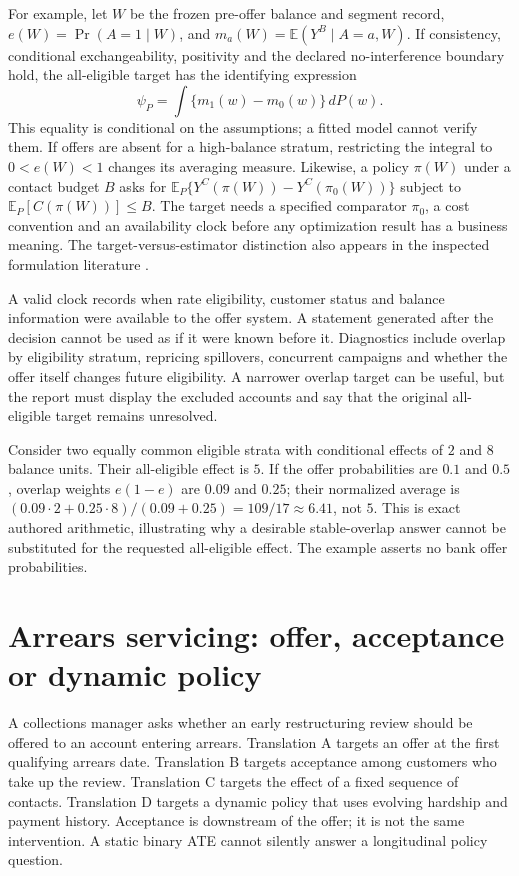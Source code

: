 For example, let $W$ be the frozen pre-offer balance and segment record, $e(W)=\Pr(A=1\mid W)$, and $m_a(W)=\mathbb E(Y^B\mid A=a,W)$. If consistency, conditional exchangeability, positivity and the declared no-interference boundary hold, the all-eligible target has the identifying expression
\[
 \psi_P=\int\{m_1(w)-m_0(w)\}\,dP(w).
\]
This equality is conditional on the assumptions; a fitted model cannot verify them. If offers are absent for a high-balance stratum, restricting the integral to $0<e(W)<1$ changes its averaging measure. Likewise, a policy $\pi(W)$ under a contact budget $B$ asks for $\mathbb E_P\{Y^C(\pi(W))-Y^C(\pi_0(W))\}$ subject to $\mathbb E_P[C(\pi(W))]\leq B$. The target needs a specified comparator $\pi_0$, a cost convention and an availability clock before any optimization result has a business meaning. The target-versus-estimator distinction also appears in the inspected formulation literature \citep{exec13_formulation_targets}.

A valid clock records when rate eligibility, customer status and balance information were available to the offer system. A statement generated after the decision cannot be used as if it were known before it. Diagnostics include overlap by eligibility stratum, repricing spillovers, concurrent campaigns and whether the offer itself changes future eligibility. A narrower overlap target can be useful, but the report must display the excluded accounts and say that the original all-eligible target remains unresolved.

Consider two equally common eligible strata with conditional effects of $2$ and $8$ balance units. Their all-eligible effect is $5$. If the offer probabilities are $0.1$ and $0.5$, overlap weights $e(1-e)$ are $0.09$ and $0.25$; their normalized average is $(0.09\cdot2+0.25\cdot8)/(0.09+0.25)=109/17\approx6.41$, not $5$. This is exact authored arithmetic, illustrating why a desirable stable-overlap answer cannot be substituted for the requested all-eligible effect. The example asserts no bank offer probabilities.

\section{Arrears servicing: offer, acceptance or dynamic policy}

A collections manager asks whether an early restructuring review should be offered to an account entering arrears. Translation A targets an offer at the first qualifying arrears date. Translation B targets acceptance among customers who take up the review. Translation C targets the effect of a fixed sequence of contacts. Translation D targets a dynamic policy that uses evolving hardship and payment history. Acceptance is downstream of the offer; it is not the same intervention. A static binary ATE cannot silently answer a longitudinal policy question.


